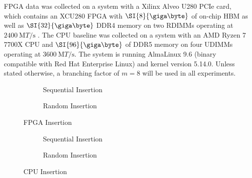 

FPGA data was collected on a system with a Xilinx Alveo U280 PCIe card,
which contains an XCU280 FPGA with $\SI{8}{\giga\byte}$ of on-chip HBM as well
as $\SI{32}{\giga\byte}$ DDR4 memory on two RDIMMs operating at
$\SI{2400}{\mega{T}\per\second}$ \autocite{u280}. The CPU baseline was collected
on a system with an AMD Ryzen 7 7700X CPU and $\SI{96}{\giga\byte}$ of DDR5
memory on four UDIMMs operating at $\SI{3600}{\mega{T}\per\second}$. The system
is running AlmaLinux 9.6 (binary compatible with Red Hat Enterprise Linux) and
kernel version 5.14.0.
%
Unless stated otherwise, a branching factor of $m=8$ will be used in all
experiments.



\begin{figure}[H]
	\centering
	\begin{subfigure}{7.5cm}
		\centering
		
		\caption{Sequential Insertion}
		\label{fig:fpga-insert-sequential}
	\end{subfigure}
	\begin{subfigure}{7.5cm}
		\centering
		
		\caption{Random Insertion}
		\label{fig:fpga-insert-random}
	\end{subfigure}
	\caption{FPGA Insertion}
	\label{fig:fpga-insert}
\end{figure}

\begin{figure}[H]
	\centering
	\begin{subfigure}{7.5cm}
		\centering
		
		\caption{Sequential Insertion}
		\label{fig:cpu-insert-sequential}
	\end{subfigure}
	\begin{subfigure}{7.5cm}
		\centering
		
		\caption{Random Insertion}
		\label{fig:cpu-insert-random}
	\end{subfigure}
	\caption{CPU Insertion}
	\label{fig:cpu-insert}
\end{figure}
